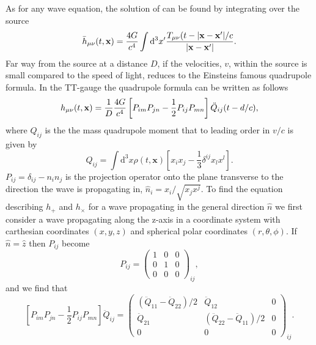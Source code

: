 As for any wave equation, the solution of  can be found by integrating over the source
\begin{equation} \label{eqT:sol}
\bar{h}_{\mu\nu}(t,\mathbf{x}) = \frac{4G}{c^4} \int \mathrm{d}^3 x' \frac{T_{\mu\nu}(t-|\mathbf{x}-\mathbf{x'}|/c}{|\mathbf{x}-\mathbf{x'}|}.
\end{equation}
Far way from the source at a distance $D$, if the velocities, $v$, within the source is small compared to the speed of light,  reduces to the Einsteins famous quadrupole formula. In the TT-gauge the quadrupole formula can be written as follows  
\begin{equation} \label{eqT:equad}
h_{\mu\nu}(t,\mathbf{x}) = \frac{1}{D} \frac{4G}{c^4} \left [P_{im} P_{jn} - \frac{1}{2} P_{ij} P_{mn} \right ] \ddot{Q}_{ij} (t -d/c),
\end{equation}
where $Q_{ij}$ is the the mass quadrupole moment that to leading order in $v/c$ is given by
\begin{equation} \label{eqT:quad}
Q_{ij} = \int \mathrm{d}^3 x \rho(t,\mathbf{x})\left [x_i x_j - \frac{1}{3} \delta^{ij} x_l x^l \right ].
\end{equation}
$P_{ij} = \delta_{ij} -n_i n_j$ is the projection operator onto the plane transverse to the direction the wave is propagating in,
$\hat{n}_i = x_i / \sqrt{x_j x^j}$. To find the equation describing $h_{+}$ and $h_{\times}$ for a wave propagating in the general direction
$\hat{n}$ we first consider a wave propagating along the z-axis in a coordinate system with carthesian coordinates $(x,y,z)$ and
spherical polar coordinates $(r,\theta,\phi)$. 
If $\hat{n} = \hat{z}$ then $P_{ij}$ become
\begin{equation} \label{eqT:pij}
P_{ij}  = 
  \begin{pmatrix}
    1 & 0 & 0  \\
    0 & 1 & 0 \\
    0 & 0 & 0
  \end{pmatrix}_{ij},
\end{equation}
and we find that 
\begin{equation} \label{eqT:pjz}
\left [P_{im} P_{jn} - \frac{1}{2} P_{ij} P_{mn} \right ] \ddot{Q}_{ij} = 
  \begin{pmatrix}
    (\ddot{Q}_{11}-\ddot{Q}_{22})/2 & \ddot{Q}_{12} & 0  \\
    \ddot{Q}_{21} & (\ddot{Q}_{22} - \ddot{Q}_{11})/2 & 0 \\
    0 & 0 & 0
  \end{pmatrix}_{ij}.
\end{equation}

